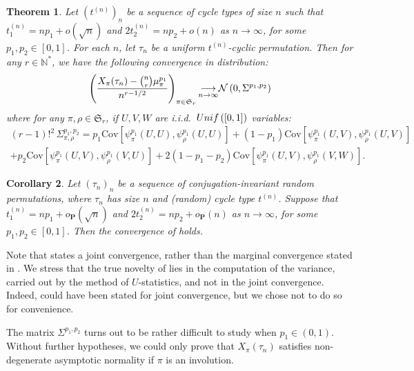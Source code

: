 \documentclass{article}
\newtheorem{theorem}{Theorem}[section]
\newtheorem{cor}[theorem]{Corollary}
\theoremstyle{remark}
\def\N{\mathbb{N}}
\def\m{\!-\!}
\newcommand{\cv}[2]{\underset{#1\to#2}{\longrightarrow}}
\def\P{\mathbf{P}}
\newcommand{\cov}[2]{\mathrm{Cov}\left[#1,#2\right]}
\newcommand{\Unif}[1]{{\rm Unif}\left(#1\right)}
\newcommand{\Normal}[2]{{\cal N}\left(#1 , #2\right)}
\def\S{\mathfrak{S}}
\begin{document}
\begin{theorem}\label{th: pattern normality t-cyclic with fixed points}
    Let $(t^{(n)})_n$ be a sequence of cycle types of size $n$ such that $t_1^{(n)} = n p_1 + o(\sqrt{n})$ and $2t_2^{(n)} = n p_2 + o(n)$ as $n\to\infty$, for some $p_1,p_2\in[0,1]$.
    For each $n$, let $\tau_n$ be a uniform $t^{(n)}$-cyclic permutation.
    Then for any $r\in\N^*$, we have the following convergence in distribution:
    \begin{equation*}
        \left( \frac{X_\pi(\tau_n) - \binom{n}{r}\mu_{\pi}^{p_1}}{n^{r-1/2}} \right)_{\pi\in\S_r}
        {\cv{n}{\infty}}
        \Normal{0}{\Sigma^{p_1,p_2}}
    \end{equation*}
    where for any $\pi,\rho\in\S_r$, if $U,V,W$ are i.i.d.~$\Unif{[0,1]}$ variables:
    \begin{multline*}
        (r\m1)!^2\, \Sigma_{\pi,\rho}^{p_1,p_2} = p_1\cov{\psi_\pi^{p_1}(U,U)}{\psi_\rho^{p_1}(U,U)} + (1\m p_1)\cov{\psi_\pi^{p_1}(U,V)}{\psi_\rho^{p_1}(U,V)} \\+ p_2\cov{\psi_\pi^{p_1}(U,V)}{\psi_\rho^{p_1}(V,U)} + 2(1\m p_1\m p_2)\cov{\psi_\pi^{p_1}(U,V)}{\psi_\rho^{p_1}(V,W)} .
    \end{multline*}
\end{theorem}

\begin{cor}\label{cor: pattern normality conjugation-invariant}
    Let $(\tau_n)_n$ be a sequence of conjugation-invariant random permutations, where $\tau_n$ has size $n$ and (random) cycle type $t^{(n)}$.
    Suppose that $t_1^{(n)} = np_1+o_\P(\sqrt n)$ and $2t_2^{(n)} = np_2+o_\P(n)$ as $n\to\infty$, for some $p_1,p_2\in[0,1]$.
    Then the convergence of  holds.
\end{cor}

Note that  states a joint convergence, rather than the marginal convergence stated in .
We stress that the true novelty of  lies in the computation of the variance, carried out by the method of $U$-statistics, and not in the joint convergence.
Indeed,  could have been stated for joint convergence, but we chose not to do so for convenience.

The matrix $\Sigma^{p_1,p_2}$ turns out to be rather difficult to study when $p_1\in(0,1)$.
Without further hypotheses, we could only prove that $X_\pi(\tau_n)$ satisfies non-degenerate asymptotic normality if $\pi$ is an involution.
\end{document}
